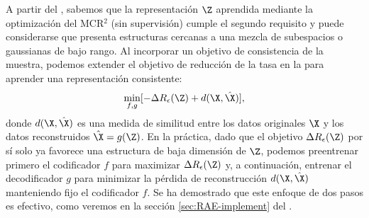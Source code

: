 \documentclass[../../book-main_es.tex]{subfiles}
\begin{document}
A partir del , sabemos que la representación
$\Z$ aprendida mediante la optimización del MCR$^2$ (sin supervisión)
cumple el segundo requisito y puede considerarse
que presenta estructuras cercanas a
una mezcla de subespacios o gaussianas de bajo rango. Al incorporar
un objetivo de consistencia de la muestra, podemos extender el objetivo de reducción de la tasa
en la  para aprender una representación consistente:
\begin{equation}
    \min_{f, g}
    [ - \Delta R_{\epsilon}(\Z) + d(\X, \hat \X)],
    \label{eqn:autoencode-consistent}
\end{equation}
donde $d(\X, \hat \X)$ es una medida de similitud entre los datos originales $\X$
y los datos reconstruidos $\hat \X = g(\Z)$. En la práctica, dado que el objetivo
$\Delta R_{\epsilon}(\Z)$ por sí solo ya favorece una estructura de baja dimensión de
$\Z$, podemos preentrenar primero el codificador $f$ para maximizar $\Delta R_{\epsilon}(\Z)$
y, a continuación, entrenar el decodificador $g$ para minimizar la pérdida de reconstrucción $d(\X,
\hat \X)$ manteniendo fijo el codificador $f$. Se ha demostrado que este enfoque de dos pasos
es efectivo, como veremos en la sección
\ref{sec:RAE-implement} del .
\end{document}

